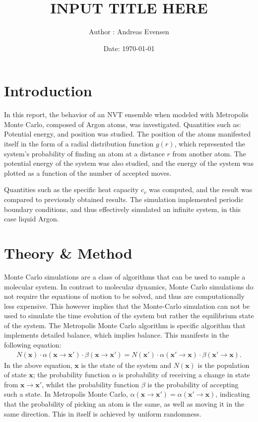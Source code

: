 \documentclass[a4paper]{article}
\title{INPUT TITLE HERE}
\author{Author : Andreas Evensen}
\date{Date: \today}
\newcommand{\newparagraph}{\vspace{.5cm}\noindent}
\begin{document}


\newpage
{}
\setcounter{page}{1}
\newpage
\tableofcontents
\newpage
{}

\section*{Introduction}
In this report, the behavior of an NVT ensemble when modeled with Metropolis Monte Carlo, composed of Argon atoms, was investigated. Quantities such as: Potential energy, and position was studied.
The position of the atoms manifested itself in the form of a radial distribution function $g(r)$, which represented the system's probability of finding an atom at a distance $r$ from another atom.
The potential energy of the system was also studied, and the energy of the system was plotted as a function of the number of accepted moves.

\newparagraph
Quantities such as the specific heat capacity $c_v$ was computed, and the result was compared to previously obtained results.
The simulation implemented periodic boundary conditions, and thus effectively simulated an infinite system, in this case liquid Argon.

\section*{Theory \& Method}
Monte Carlo simulations are a class of algorithms that can be used to sample a molecular system.
In contrast to molecular dynamics, Monte Carlo simulations do not require the equations of motion to be solved, and thus are computationally less expensive.
This however implies that the Monte-Carlo simulation can not be used to simulate the time evolution of the system but rather the equilibrium state of the system.
The Metropolis Monte Carlo algorithm is specific algorithm that implements detailed balance, which implies balance.
This manifests in the following equation:
\begin{align}
    N(\mathbf{x})\cdot \alpha(\mathbf{x}\to\mathbf{x}') \cdot \beta(\mathbf{x}\to\mathbf{x}') = N(\mathbf{x}')\cdot \alpha(\mathbf{x}'\to\mathbf{x}) \cdot \beta(\mathbf{x}'\to\mathbf{x}).\label{eq: detailed balance}
\end{align}In the above equation, $\mathbf{x}$ is the state of the system and $N(\mathbf{x})$ is the population of state $\mathbf{x}$; the probability function $\alpha$ is probability of receiving a change in state from $\mathbf{x}\to\mathbf{x}'$, whilst the probability function $\beta$ is the probability of accepting such a state.
In Metropolis Monte Carlo, $\alpha(\mathbf{x}\to\mathbf{x}') = \alpha(\mathbf{x}'\to\mathbf{x})$, indicating that the probability of picking an atom is the same, as well as moving it in the same direction. This in itself is achieved by uniform randomness.
\end{document}
